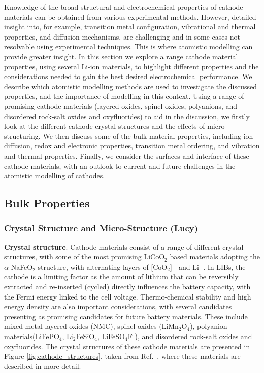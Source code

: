 \documentclass[../main.tex]{subfiles}
\begin{document}
Knowledge of the broad structural and electrochemical properties of cathode materials can be obtained from various experimental methods. However, detailed insight into, for example, transition metal configuration, vibrational and thermal properties, and diffusion mechanisms, are challenging and in some cases not resolvable using experimental techniques. This is where atomistic modelling can provide greater insight. In this section we explore a range cathode material properties, using several Li-ion materials, to highlight different properties and the considerations needed to gain the best desired electrochemical performance. We describe which atomistic modelling methods are used to investigate the discussed properties, and the importance of modelling in this context. Using a range of promising cathode materials (layered oxides, spinel oxides, polyanions, and disordered rock-salt oxides and oxyfluorides) to aid in the discussion, we firstly look at the different cathode crystal structures and the effects of micro-structuring. We then discuss some of the bulk material properties, including ion diffusion, redox and electronic properties, transition metal ordering, and vibration and thermal properties. Finally, we consider the surfaces and interface of these cathode materials, with an outlook to current and future challenges in the atomistic modelling of cathodes.

\subsection{Bulk Properties}
\subsubsection{Crystal Structure and Micro-Structure (Lucy)}
\textbf{Crystal structure}. Cathode materials consist of a range of different crystal structures, with some of the most promising LiCoO$_2$ based materials adopting the $\alpha$-NaFeO$_2$ structure, with alternating layers of [CoO$_2$]$^-$ and Li$^+$. In LIBs, the cathode is a limiting factor as the amount of lithium that can be reversibly extracted and re-inserted (cycled) directly influences the battery capacity, with the Fermi energy linked to the cell voltage. \cite{islam2014lithium} Thermo-chemical stability and high energy density are also important considerations, with several candidates presenting as promising candidates for future battery materials. These include mixed-metal layered oxides (NMC), spinel oxides (LiMn$_2$O$_4$), polyanion materials(LiFePO$_4$, \cite{whittingham2008materials,masquelier2013polyanionic,goodenough_li-ion_2013, zaghib2013review} Li$_2$FeSiO$_4$, \cite{nyten2005electrochemical,sirisopanaporn2011polymorphism,islam2011silicate} LiFeSO$_4$F \cite{padhi1997mapping}), and disordered rock-salt oxides and oxyfluorides.\cite{Jacquet2019, clement2020, Chang2020, Tygesen2020, Sharpe2020} The crystal structures of these cathode materials are presented in Figure \ref{fig:cathode_structures}, taken from Ref.~, where these materials are described in more detail.
\end{document}
